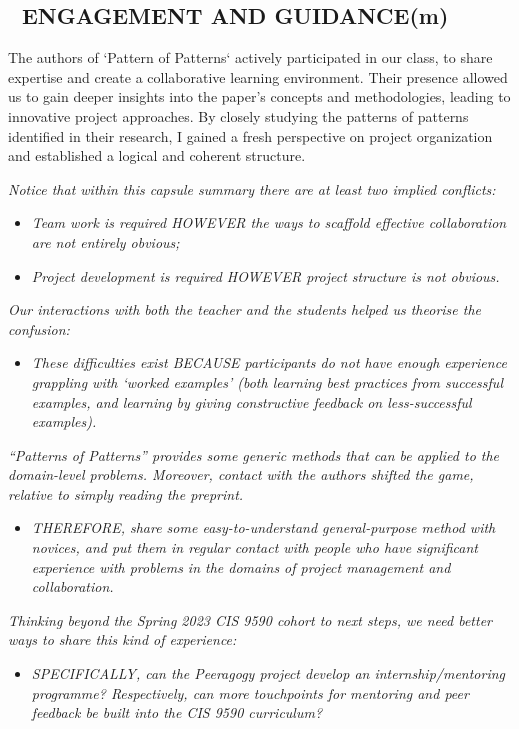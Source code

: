 \documentclass[acmlarge,timestamp]{acmart}
\newcommand{\motor}{(m)}
\begin{document}
\subsection*{💎 ENGAGEMENT AND GUIDANCE{\hfill \motor}}
The authors of ‘Pattern of Patterns‘ actively participated in our
class, to share expertise and create a collaborative learning
environment. Their presence allowed us to gain deeper insights into
the paper's concepts and methodologies, leading to innovative project
approaches. By closely studying the patterns of patterns identified in
their research, I gained a fresh perspective on project organization
and established a logical and coherent structure.

\smallskip
\noindent\emph{Notice that within this capsule summary there are at least two implied conflicts:}
\begin{itemize}
\item \emph{Team work is required HOWEVER the ways to scaffold effective collaboration are not entirely obvious;}
\item \emph{Project development is required HOWEVER project structure is not obvious.}
\end{itemize}
\emph{Our interactions with both the teacher and the students helped us theorise the confusion:}
\begin{itemize}
\item \emph{These difficulties exist BECAUSE participants do not have enough experience grappling with ‘worked examples’ (both learning best practices from successful examples, and learning by giving constructive feedback on less-successful examples).} 
\end{itemize}
\emph{“Patterns of Patterns” provides some generic methods that can be applied to the domain-level problems.  Moreover, contact with the authors shifted the game, relative to simply reading the preprint.}
\begin{itemize}
\item \emph{THEREFORE, share some easy-to-understand general-purpose method with novices, and put them in regular contact with people who have significant experience with problems in the domains of project management and collaboration.} 
\end{itemize}
\emph{Thinking beyond the Spring 2023 CIS 9590 cohort to next steps, we need better ways to share this kind of experience:}
\begin{itemize}
\item \emph{SPECIFICALLY, can the Peeragogy project develop an internship/mentoring programme?  Respectively, can more touchpoints for mentoring and peer feedback be built into the CIS 9590 curriculum?} 
\end{itemize}
\end{document}

